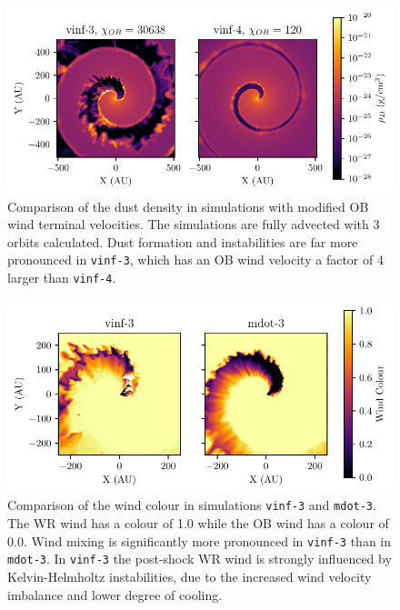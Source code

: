 \documentclass[fleqn,usenatbib]{mnras}
\begin{document}





\begin{figure}
  \centering
  \includegraphics[width=\linewidth]{assets/results/vinf/vinf-rhod.pdf}
  \caption[OB terminal velocity wind dust comparison]{Comparison of the dust density in simulations with modified OB wind terminal velocities. The simulations are fully advected with 3 orbits calculated. Dust formation and instabilities are far more pronounced in \texttt{vinf-3}, which has an OB wind velocity a factor of 4 larger than \texttt{vinf-4}.}
  \label{fig:obvinfzcomp}
\end{figure}

\begin{figure}
  \centering
  \includegraphics[width=\linewidth]{assets/results/mixed/eta-004-comparison-r0.pdf}
  \caption[Wind colour comparison of $\eta = 0.04$ winds]{Comparison of the wind colour in simulations \texttt{vinf-3} and \texttt{mdot-3}. The WR wind has a colour of 1.0 while the OB wind has a colour of 0.0. Wind mixing is significantly more pronounced in \texttt{vinf-3} than in \texttt{mdot-3}. In \texttt{vinf-3} the post-shock WR wind is strongly influenced by Kelvin-Helmholtz instabilities, due to the increased wind velocity imbalance and lower degree of cooling.}
  \label{fig:eta004comparisoncolour}
\end{figure}
\end{document}
